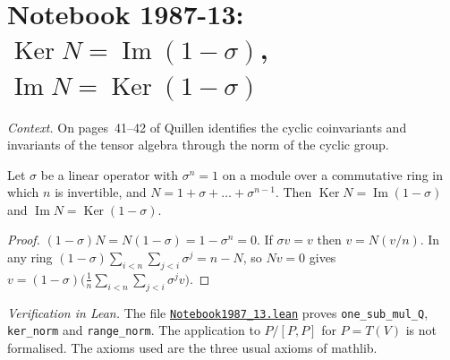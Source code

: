 \section[Notebook 1987-13: kernel and image of the norm]{Notebook 1987-13: $\operatorname{Ker}N = \operatorname{Im}(1 - \sigma)$, $\operatorname{Im}N = \operatorname{Ker}(1 - \sigma)$\protect{}}\label{sec:quillen-1987-13}

\emph{Context.} On pages~41--42 of  Quillen identifies the cyclic coinvariants and invariants of the tensor algebra through the norm of the cyclic group.

\begin{encadre}
\begin{theoreme}\label{thm:quillen-1987-13}
Let $\sigma$ be a linear operator with $\sigma^n = 1$ on a module over a commutative ring in which $n$ is invertible, and $N = 1 + \sigma + \dots + \sigma^{n-1}$. Then $\operatorname{Ker}N = \operatorname{Im}(1 - \sigma)$ and $\operatorname{Im}N = \operatorname{Ker}(1 - \sigma)$.
\end{theoreme}
\end{encadre}

\begin{proof}
$(1 - \sigma)N = N(1 - \sigma) = 1 - \sigma^n = 0$. If $\sigma v = v$ then $v = N(v/n)$. In any ring $(1 - \sigma)\sum_{i<n}\sum_{j<i}\sigma^j = n - N$, so $Nv = 0$ gives $v = (1 - \sigma)\bigl(\tfrac1n\sum_{i<n}\sum_{j<i}\sigma^jv\bigr)$.
\end{proof}

\emph{Verification in Lean.} The file \href{\leanblobmain/Notebook1987_13.lean}{\texttt{Notebook1987\_13.\allowbreak{}lean}} proves \texttt{one\_sub\_mul\_Q}, \texttt{ker\_norm} and \texttt{range\_norm}. The application to $P/[P, P]$ for $P = T(V)$ is not formalised. The axioms used are the three usual axioms of mathlib.

